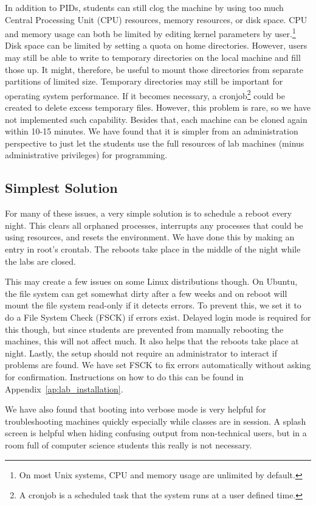 In addition to PIDs, students can still clog the machine by using too much Central Processing Unit (CPU) resources, memory resources, or disk space.  CPU and memory usage can both be limited by editing kernel parameters by user.\footnote{On most Unix systems, CPU and memory usage are unlimited by default.}  Disk space can be limited by setting a quota on home directories.  However, users may still be able to write to temporary directories on the local machine and fill those up.  It might, therefore, be useful to mount those directories from separate partitions of limited size.  Temporary directories may still be important for operating system performance.  If it becomes necessary, a cronjob\footnote{A cronjob is a scheduled task that the system runs at a user defined time.} could be created to delete excess temporary files.  However, this problem is rare, so we have not implemented such capability.  Besides that, each machine can be cloned again within 10-15 minutes.  We have found that it is simpler from an administration perspective to just let the students use the full resources of lab machines (minus administrative privileges) for programming.  

\subsection{Simplest Solution}
For many of these issues, a very simple solution is to schedule a reboot every night.  This clears all orphaned processes, interrupts any processes that could be using resources, and resets the environment.  We have done this by making an entry in root's crontab.  The reboots take place in the middle of the night while the labs are closed. 

This may create a few issues on some Linux distributions though.  On Ubuntu, the file system can get somewhat dirty after a few weeks and on reboot will mount the file system read-only if it detects errors.  To prevent this, we set it to do a File System Check (FSCK) if errors exist.  Delayed login mode is required for this though, but since students are prevented from manually rebooting the machines, this will not affect much.  It also helps that the reboots take place at night.  Lastly, the setup should not require an administrator to interact if problems are found.  We have set FSCK to fix errors automatically without asking for confirmation.  Instructions on how to do this can be found in Appendix~\ref{ap:lab_installation}.

We have also found that booting into verbose mode is very helpful for troubleshooting machines quickly especially while classes are in session.  A splash screen is helpful when hiding confusing output from non-technical users, but in a room full of computer science students this really is not necessary.  
